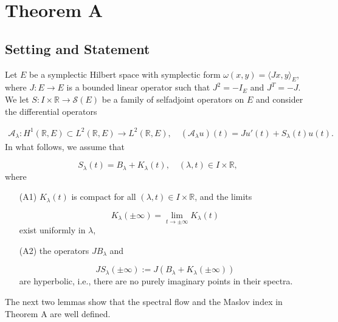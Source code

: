 \documentclass[a4paper,10pt]{article}
\begin{document}




\section{Theorem A}

\subsection{Setting and Statement}
Let $E$ be a symplectic Hilbert space with symplectic form $\omega(x,y)=\langle Jx,y\rangle_E$, where $J:E\rightarrow E$ is a bounded linear operator such that $J^2=-I_E$ and $J^T=-J$. We let $S:I\times\mathbb{R}\rightarrow\mathcal{S}(E)$ be a family of selfadjoint operators on $E$ and consider the differential operators


\begin{align}\label{Alambda}
\mathcal{A}_\lambda:H^1(\mathbb{R},E)\subset L^2(\mathbb{R},E)\rightarrow L^2(\mathbb{R},E),\quad(\mathcal{A}_\lambda u)(t)=Ju'(t)+S_\lambda(t)u(t).
\end{align}
In what follows, we assume that 

\[S_\lambda(t)=B_\lambda+K_\lambda(t),\quad (\lambda,t)\in I\times\mathbb{R},\]
where

\begin{itemize}
\item[(A1)] $K_\lambda(t)$ is compact for all $(\lambda,t)\in I\times\mathbb{R}$, and the limits

\[K_\lambda(\pm\infty)=\lim_{t\rightarrow\pm\infty}K_\lambda(t)\]
exist uniformly in $\lambda$,
\item[(A2)] the operators $JB_\lambda$ and

\[JS_\lambda(\pm\infty):=J(B_\lambda+K_\lambda(\pm\infty))\]
are hyperbolic, i.e., there are no purely imaginary points in their spectra.
\end{itemize}
The next two lemmas show that the spectral flow and the Maslov index in Theorem A are well defined.
\end{document}
